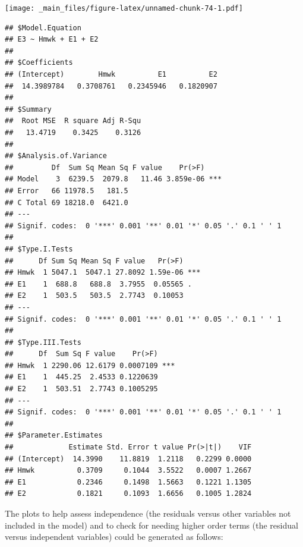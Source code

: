 \documentclass[
]{book}
\newenvironment{Shaded}{\begin{snugshade}}{\end{snugshade}}
\newcommand{\AttributeTok}[1]{\textcolor[rgb]{0.77,0.63,0.00}{#1}}
\newcommand{\DecValTok}[1]{\textcolor[rgb]{0.00,0.00,0.81}{#1}}
\newcommand{\DocumentationTok}[1]{\textcolor[rgb]{0.56,0.35,0.01}{\textbf{\textit{#1}}}}
\newcommand{\FunctionTok}[1]{\textcolor[rgb]{0.00,0.00,0.00}{#1}}
\newcommand{\NormalTok}[1]{#1}
\newcommand{\OtherTok}[1]{\textcolor[rgb]{0.56,0.35,0.01}{#1}}
\newcommand{\SpecialCharTok}[1]{\textcolor[rgb]{0.00,0.00,0.00}{#1}}
\begin{document}
\texttt{[image: \_main\_files/figure-latex/unnamed-chunk-74-1.pdf]}

\begin{verbatim}
## $Model.Equation
## E3 ~ Hmwk + E1 + E2
## 
## $Coefficients
## (Intercept)        Hmwk          E1          E2 
##  14.3989784   0.3708761   0.2345946   0.1820907 
## 
## $Summary
##  Root MSE  R square Adj R-Squ 
##   13.4719    0.3425    0.3126 
## 
## $Analysis.of.Variance
##         Df  Sum Sq Mean Sq F value    Pr(>F)    
## Model    3  6239.5  2079.8   11.46 3.859e-06 ***
## Error   66 11978.5   181.5                      
## C Total 69 18218.0  6421.0                      
## ---
## Signif. codes:  0 '***' 0.001 '**' 0.01 '*' 0.05 '.' 0.1 ' ' 1
## 
## $Type.I.Tests
##      Df Sum Sq Mean Sq F value   Pr(>F)    
## Hmwk  1 5047.1  5047.1 27.8092 1.59e-06 ***
## E1    1  688.8   688.8  3.7955  0.05565 .  
## E2    1  503.5   503.5  2.7743  0.10053    
## ---
## Signif. codes:  0 '***' 0.001 '**' 0.01 '*' 0.05 '.' 0.1 ' ' 1
## 
## $Type.III.Tests
##      Df  Sum Sq F value    Pr(>F)    
## Hmwk  1 2290.06 12.6179 0.0007109 ***
## E1    1  445.25  2.4533 0.1220639    
## E2    1  503.51  2.7743 0.1005295    
## ---
## Signif. codes:  0 '***' 0.001 '**' 0.01 '*' 0.05 '.' 0.1 ' ' 1
## 
## $Parameter.Estimates
##             Estimate Std. Error t value Pr(>|t|)    VIF
## (Intercept)  14.3990    11.8819  1.2118   0.2299 0.0000
## Hmwk          0.3709     0.1044  3.5522   0.0007 1.2667
## E1            0.2346     0.1498  1.5663   0.1221 1.1305
## E2            0.1821     0.1093  1.6656   0.1005 1.2824
\end{verbatim}

The plots to help assess independence (the residuals versus other variables not included in the model) and to check for needing higher order terms (the residual versus independent variables) could be generated as follows:

\begin{Shaded}
\end{Shaded}
\end{document}
